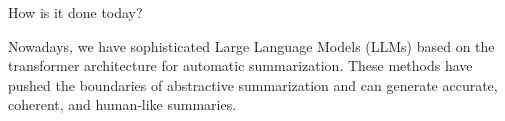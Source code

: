 \begin{frame}{How is it done today?}

	Nowadays, we have sophisticated Large Language Models (LLMs) based on the
	transformer architecture for automatic summarization.
	These methods have pushed the boundaries of abstractive summarization and can
	generate accurate, coherent, and human-like summaries.

\vskip 1.3cm


\end{frame}
